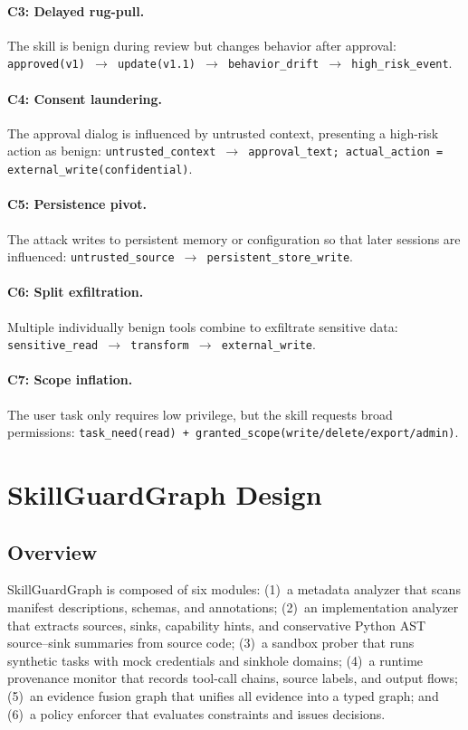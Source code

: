 \documentclass[10pt]{article}
\begin{document}
\paragraph{C3: Delayed rug-pull.}
The skill is benign during review but changes behavior after approval: \texttt{approved(v1) $\rightarrow$ update(v1.1) $\rightarrow$ behavior\_drift $\rightarrow$ high\_risk\_event}.

\paragraph{C4: Consent laundering.}
The approval dialog is influenced by untrusted context, presenting a high-risk action as benign: \texttt{untrusted\_context $\rightarrow$ approval\_text; actual\_action = external\_write(confidential)}.

\paragraph{C5: Persistence pivot.}
The attack writes to persistent memory or configuration so that later sessions are influenced: \texttt{untrusted\_source $\rightarrow$ persistent\_store\_write}.

\paragraph{C6: Split exfiltration.}
Multiple individually benign tools combine to exfiltrate sensitive data: \texttt{sensitive\_read $\rightarrow$ transform $\rightarrow$ external\_write}.

\paragraph{C7: Scope inflation.}
The user task only requires low privilege, but the skill requests broad permissions: \texttt{task\_need(read) + granted\_scope(write/delete/export/admin)}.

\section{SkillGuardGraph Design}
\label{sec:design}

\subsection{Overview}

SkillGuardGraph is composed of six modules: (1)~a metadata analyzer that scans manifest descriptions, schemas, and annotations; (2)~an implementation analyzer that extracts sources, sinks, capability hints, and conservative Python AST source--sink summaries from source code; (3)~a sandbox prober that runs synthetic tasks with mock credentials and sinkhole domains; (4)~a runtime provenance monitor that records tool-call chains, source labels, and output flows; (5)~an evidence fusion graph that unifies all evidence into a typed graph; and (6)~a policy enforcer that evaluates constraints and issues decisions.
\end{document}
